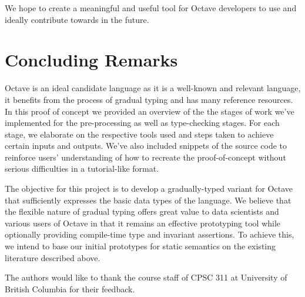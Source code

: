 We hope to create a meaningful and useful tool for Octave developers to use and ideally contribute towards in the future.

\section{Concluding Remarks}
Octave is an ideal candidate language as it is a well-known and relevant language, it benefits from the process of gradual typing and has many reference resources. In this proof of concept we provided an overview of the the stages of work we've implemented for the pre-processing as well as type-checking stages. For each stage, we elaborate on the respective tools used and steps taken to achieve certain inputs and outputs. We've also included snippets of the source code to reinforce users' understanding of how to recreate the proof-of-concept without serious difficulties in a tutorial-like format.

The objective for this project is to develop a gradually-typed variant for Octave that sufficiently expresses the basic data types of the language. We believe that the flexible nature of gradual typing offers great value to data scientists and various users of Octave in that it remains an effective prototyping tool while optionally providing compile-time type and invariant assertions. To achieve this, we intend to base our initial prototypes for static semantics on the existing literature described above.

\appendix

\begin{acks}
    The authors would like to thank the course staff of CPSC 311 at University
    of British Columbia for their feedback.
\end{acks}
